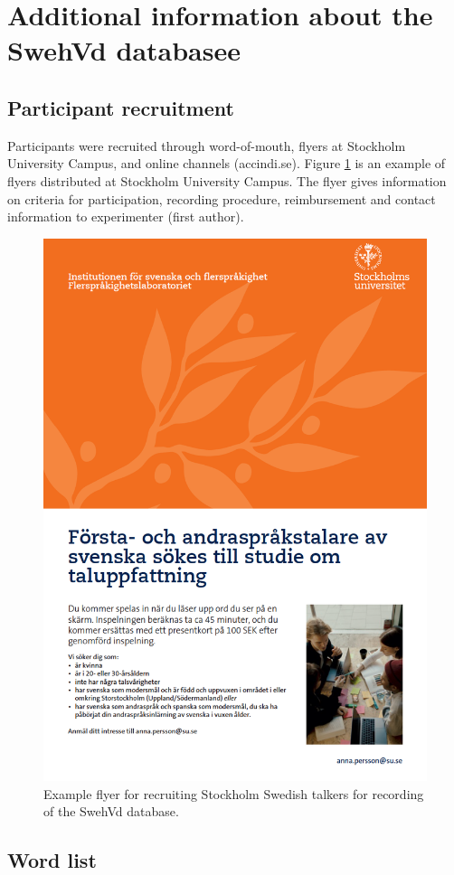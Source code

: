 \documentclass[utf8]{frontiers_suppmat} %
\begin{document}
\hypertarget{additional-information-about-the-swehvd-databasee}{%
\section{Additional information about the SwehVd databasee}\label{additional-information-about-the-swehvd-databasee}}

\hypertarget{sec:recruitment}{%
\subsection{Participant recruitment}\label{sec:recruitment}}

Participants were recruited through word-of-mouth, flyers at Stockholm University Campus, and online channels (accindi.se). Figure \ref{fig:flyer} is an example of flyers distributed at Stockholm University Campus. The flyer gives information on criteria for participation, recording procedure, reimbursement and contact information to experimenter (first author).



\begin{figure}
\includegraphics[width=0.65\linewidth]{../../ad_recruitment} \caption{Example flyer for recruiting Stockholm Swedish talkers for recording of the SwehVd database.}\label{fig:flyer}
\end{figure}

\hypertarget{sec:wordlist}{%
\subsection{Word list}\label{sec:wordlist}}
\end{document}
